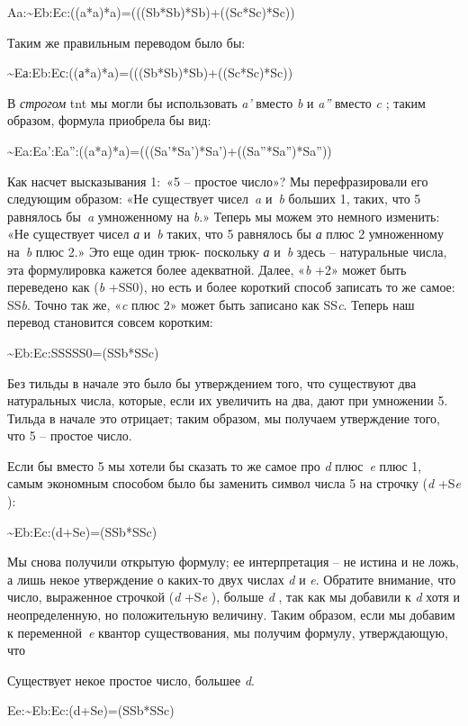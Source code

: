 \documentclass[../main.tex]{subfiles}
\begin{document}
Aa:\textasciitilde Eb:Ec:((a*a)*a)=(((Sb*Sb)*Sb)+((Sc*Sc)*Sc))

Таким же правильным переводом было бы:

\textasciitilde Eа:Eb:Eс:((а*a)*a)=(((Sb*Sb)*Sb)+((Sc*Sc)*Sc))

В \emph{строгом} \acs{tnt} мы могли бы использовать \emph{a'} вместо \emph{b} и \emph{a''} вместо \emph{c} ; таким образом, формула приобрела бы вид:

\textasciitilde Ea:Ea':Ea'':((a*a)*a)=(((Sa'*Sa')*Sa')+((Sa''*Sa'')*Sa''))

Как насчет высказывания 1:~«5 \--- простое число»? Мы перефразировали его следующим образом: «Не существует чисел~\emph{a} и~\emph{b} больших 1, таких, что 5 равнялось бы~\emph{a} умноженному на \emph{b}.» Теперь мы можем это немного изменить: «Не существует чисел \emph{а} и~\emph{b} таких, что 5 равнялось бы \emph{а} плюс 2 умноженному на~\emph{b} плюс 2.» Это еще один трюк- поскольку \emph{а} и~\emph{b} здесь \--- натуральные числа, эта формулировка кажется более адекватной. Далее, «\emph{b} +2» может быть переведено как (\emph{b} +SS0), но есть и более короткий способ записать то же самое: SS\emph{b}. Точно так же, «\emph{c} плюс 2» может быть записано как SS\emph{c}. Теперь наш перевод становится совсем коротким:

\textasciitilde Eb:Ec:SSSSS0=(SSb*SSc)

Без тильды в начале это было бы утверждением того, что существуют два натуральных числа, которые, если их увеличить на два, дают при умножении 5. Тильда в начале это отрицает; таким образом, мы получаем утверждение того, что 5 \--- простое число.

Если бы вместо 5 мы хотели бы сказать то же самое про \emph{d} плюс~\emph{e} плюс 1, самым экономным способом было бы заменить символ числа 5 на строчку (\emph{d} +S\emph{e} ):

\textasciitilde Eb:Ec:(d+Se)=(SSb*SSc)

Мы снова получили открытую формулу; ее интерпретация \--- не истина и не ложь, а лишь некое утверждение о каких-то двух числах \emph{d} и \emph{e}. Обратите внимание, что число, выраженное строчкой (\emph{d} +S\emph{e} ), больше \emph{d} , так как мы добавили к \emph{d} хотя и неопределенную, но положительную величину. Таким образом, если мы добавим к переменной~\emph{e} квантор существования, мы получим формулу, утверждающую, что

Существует некое простое число, большее \emph{d}.

Ee:\textasciitilde Eb:Ec:(d+Se)=(SSb*SSc)
\end{document}
